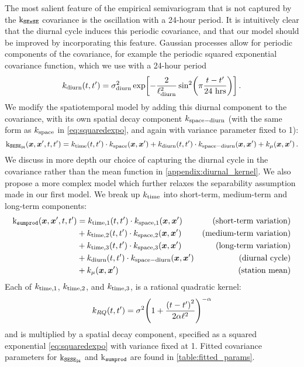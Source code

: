 The most salient feature of the empirical semivariogram that is not captured by the \(\operatorname{k_{\mathtt{SExSE}}}\) covariance is the oscillation with a 24-hour period.
It is intuitively clear that the diurnal cycle induces this periodic covariance, and that our model should be improved by incorporating this feature.
Gaussian processes allow for periodic components of the covariance, for example the periodic squared exponential covariance function, which we use with a 24-hour period
\begin{equation}
    k_{\subdiurn}(t,t') = \sigma_{\subdiurn}^2 \exp\sbr{ - \frac{2}{\ell_{\subdiurn}^2} \sin^2\del{
        \pi \frac{t-t'}{\text{24 hrs}} 
        }}\,.
    \label{eq:kperiodic}
\end{equation}
We modify the spatiotemporal model by adding this diurnal component to the covariance, with its own spatial decay component \(k_{\mathrm{space}{}-\mathrm{diurn}}\) (with the same form as \(k_{\mathrm{space}}\) in \autoref{eq:squaredexpo}, and again with variance parameter fixed to 1):
\begin{equation}
    \operatorname{k_{\mathtt{SESE_{24}}}}(\bm{x},\bm{x}',t,t') = k_{\mathrm{time}}(t,t') \cdot k_{\mathrm{space}}(\bm{x}, \bm{x}') 
        + k_{\mathrm{diurn}}(t,t') \cdot k_{\mathrm{space}{}-\mathrm{diurn}}(\bm{x}, \bm{x}')
        + k_\mu(\bm{x}, \bm{x}') 
        \,.
    \label{eq:kdiurn}
\end{equation}
We discuss in more depth our choice of capturing the diurnal cycle in the covariance rather than the mean function in \autoref{appendix:diurnal_kernel}.
We also propose a more complex model which further relaxes the separability assumption made in our first model.
We break up \(k_{\mathrm{time}}\) into short-term, medium-term and long-term components:
\begin{equation}
\begin{aligned}
    \operatorname{k_{\mathtt{sumprod}}}(\bm{x},\bm{x}',t,t') &= 
           k_{\mathrm{time}{},1}(t,t') \cdot k_{\mathrm{space}{},1}(\bm{x}, \bm{x}')  &\text{(short-term variation)} \\
        &+ k_{\mathrm{time}{},2}(t,t') \cdot k_{\mathrm{space}{},2}(\bm{x}, \bm{x}')  &\text{(medium-term variation)} \\
        &+ k_{\mathrm{time}{},3}(t,t') \cdot k_{\mathrm{space}{},3}(\bm{x}, \bm{x}')  &\text{(long-term variation)} \\
        &+ k_{\mathrm{diurn}}(t,t') \cdot k_{\mathrm{space}{}-\mathrm{diurn}}(\bm{x}, \bm{x}') &\text{(diurnal cycle)} \\
        &+ k_\mu(\bm{x}, \bm{x}') &\text{(station mean)}
\end{aligned}
\label{eq:sumprod_kernel}
\end{equation}
Each of \(k_{\mathrm{time}{},1}\), \(k_{\mathrm{time}{},2}\), and \(k_{\mathrm{time}{},3}\), is a rational quadratic kernel:
\begin{equation}
    k_{RQ}(t,t') = \sigma^2 \del{1 + \frac{\del{t-t'}^2}{2\alpha\ell^2} }^{-\alpha}
\end{equation}
and is multiplied by a spatial decay component, specified as a squared exponential \autoref{eq:squaredexpo} with variance fixed at 1.
Fitted covariance parameters for \(\operatorname{k_{\mathtt{SESE_{24}}}}\) and \(\operatorname{k_{\mathtt{sumprod}}}\) are found in \autoref{table:fitted_params}.

